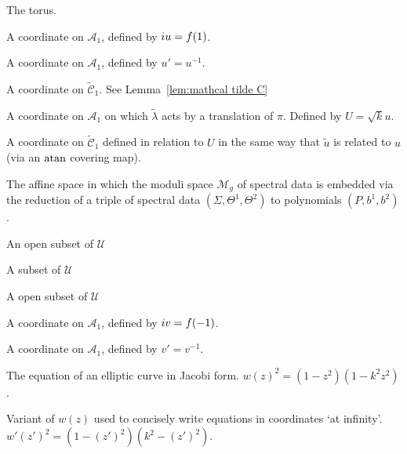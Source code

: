 \begin{description}[align=right]
\item[$\mathbb{T}^2$] The torus.

\item[$u$] A coordinate on $\mathcal{A}_1$, defined by $i u = f(1)$.

\item[$u'$] A coordinate on $\mathcal{A}_1$, defined by $u' = u^{-1}$.

\item[$\tilde{u}$] A coordinate on $\mathcal{\tilde{C}}_1$. See Lemma~\ref{lem:mathcal tilde C}

\item[$U$] A coordinate on $\mathcal{A}_1$ on which $\tilde{λ}$ acts by a translation of $π$. Defined by $U=\sqrt{k} u$.

\item[$\tilde{U}$] A coordinate on $\mathcal{\tilde{C}}_1$ defined in relation to $U$ in the same way that $\tilde{u}$ is related to $u$ (via an $\operatorname{atan}$ covering map).

\item[$\mathcal{U}$] The affine space in which the moduli space $\mathcal{M}_g$ of spectral data is embedded via the reduction of a triple of spectral data $(Σ,Θ^1,Θ^2)$ to polynomials $(P,b^1,b^2)$.

\item[$\mathcal{U}'$] An open subset of $\mathcal{U}$

\item[$\mathcal{U}''$] A subset of $\mathcal{U}$

\item[$\mathcal{U}^{(i)}$] A open subset of $\mathcal{U}$

\item[$v$] A coordinate on $\mathcal{A}_1$, defined by $i v = f(-1)$.

\item[$v'$] A coordinate on $\mathcal{A}_1$, defined by $v' = v^{-1}$.

\item[$\tilde{v}$]

\item[$V$]

\item[$\tilde{V}$]

\item[$w(z)$] The equation of an elliptic curve in Jacobi form. $w(z)^2 = (1-z^2)(1-k^2z^2)$.

\item[$w'(z')$] Variant of $w(z)$ used to concisely write equations in coordinates `at infinity'. $w'(z')^2 = (1-(z')^2)(k^2 - (z')^2)$.


\end{description}
